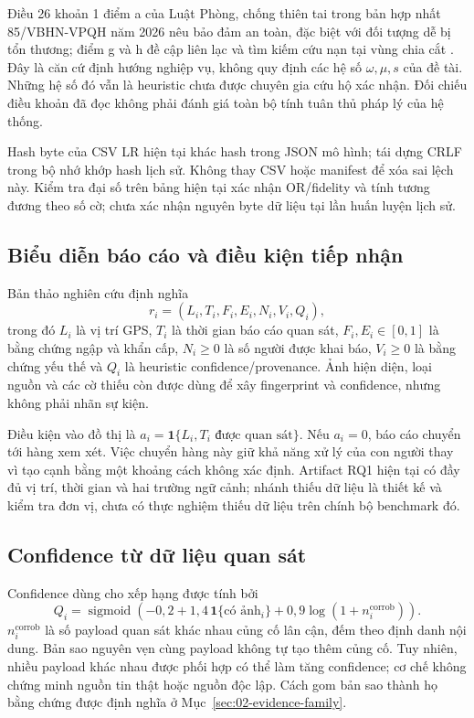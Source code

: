 Điều 26 khoản 1 điểm a của Luật Phòng, chống thiên tai trong bản hợp nhất 85/VBHN-VPQH năm 2026 nêu bảo đảm an toàn, đặc biệt với đối tượng dễ bị tổn thương; điểm g và h đề cập liên lạc và tìm kiếm cứu nạn tại vùng chia cắt \citep{vnDisasterLaw2026}. Đây là căn cứ định hướng nghiệp vụ, không quy định các hệ số $\omega,\mu,s$ của đề tài. Những hệ số đó vẫn là heuristic chưa được chuyên gia cứu hộ xác nhận. Đối chiếu điều khoản đã đọc không phải đánh giá toàn bộ tính tuân thủ pháp lý của hệ thống.

Hash byte của CSV LR hiện tại khác hash trong JSON mô hình; tái dựng CRLF trong bộ nhớ khớp hash lịch sử. Không thay CSV hoặc manifest để xóa sai lệch này. Kiểm tra đại số trên bảng hiện tại xác nhận OR/fidelity và tính tương đương theo số cờ; chưa xác nhận nguyên byte dữ liệu tại lần huấn luyện lịch sử.

\subsection{Biểu diễn báo cáo và điều kiện tiếp nhận}
Bản thảo nghiên cứu định nghĩa
\begin{equation}
 r_i=(L_i,T_i,F_i,E_i,N_i,V_i,Q_i),
 \label{eq:report-tuple}
\end{equation}
trong đó $L_i$ là vị trí GPS, $T_i$ là thời gian báo cáo quan sát, $F_i,E_i\in[0,1]$ là bằng chứng ngập và khẩn cấp, $N_i\geq0$ là số người được khai báo, $V_i\geq0$ là bằng chứng yếu thế và $Q_i$ là heuristic confidence/provenance. Ảnh hiện diện, loại nguồn và các cờ thiếu còn được dùng để xây fingerprint và confidence, nhưng không phải nhãn sự kiện.

Điều kiện vào đồ thị là $a_i=\mathbf{1}\{L_i,T_i\text{ được quan sát}\}$. Nếu $a_i=0$, báo cáo chuyển tới hàng xem xét. Việc chuyển hàng này giữ khả năng xử lý của con người thay vì tạo cạnh bằng một khoảng cách không xác định. Artifact RQ1 hiện tại có đầy đủ vị trí, thời gian và hai trường ngữ cảnh; nhánh thiếu dữ liệu là thiết kế và kiểm tra đơn vị, chưa có thực nghiệm thiếu dữ liệu trên chính bộ benchmark đó.

\subsection{Confidence từ dữ liệu quan sát}
Confidence dùng cho xếp hạng được tính bởi
\begin{equation}
 Q_i=\operatorname{sigmoid}\!\left(-0{,}2+1{,}4\,\mathbf{1}\{\text{có ảnh}_i\}
               +0{,}9\log(1+n_i^{\mathrm{corrob}})\right).
 \label{eq:confidence-report}
\end{equation}
$n_i^{\mathrm{corrob}}$ là số payload quan sát khác nhau củng cố lân cận, đếm theo định danh nội dung. Bản sao nguyên vẹn cùng payload không tự tạo thêm củng cố. Tuy nhiên, nhiều payload khác nhau được phối hợp có thể làm tăng confidence; cơ chế không chứng minh nguồn tin thật hoặc nguồn độc lập. Cách gom bản sao thành họ bằng chứng được định nghĩa ở Mục~\ref{sec:02-evidence-family}.


